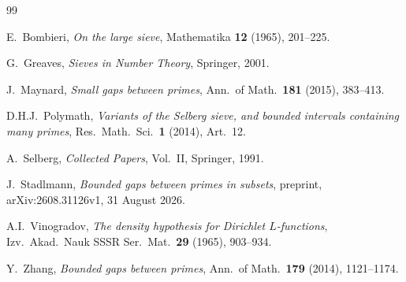 \documentclass[11pt,a4paper]{article}
\theoremstyle{plain}
\theoremstyle{definition}
\theoremstyle{plain}
\numberwithin{equation}{section}
\begin{document}
\begin{thebibliography}{99}

E.~Bombieri,
\textit{On the large sieve},
Mathematika \textbf{12} (1965), 201--225.

G.~Greaves,
\textit{Sieves in Number Theory},
Springer, 2001.

J.~Maynard,
\textit{Small gaps between primes},
Ann.\ of Math.\ \textbf{181} (2015), 383--413.

D.H.J.~Polymath,
\textit{Variants of the Selberg sieve, and bounded intervals containing many primes},
Res.\ Math.\ Sci.\ \textbf{1} (2014), Art.~12.

A.~Selberg,
\textit{Collected Papers}, Vol.~II,
Springer, 1991.

J.~Stadlmann,
\textit{Bounded gaps between primes in subsets},
preprint, arXiv:2608.31126v1, 31 August 2026.

A.I.~Vinogradov,
\textit{The density hypothesis for Dirichlet \(L\)-functions},
Izv.\ Akad.\ Nauk SSSR Ser.\ Mat.\ \textbf{29} (1965), 903--934.

Y.~Zhang,
\textit{Bounded gaps between primes},
Ann.\ of Math.\ \textbf{179} (2014), 1121--1174.

\end{thebibliography}
\end{document}

